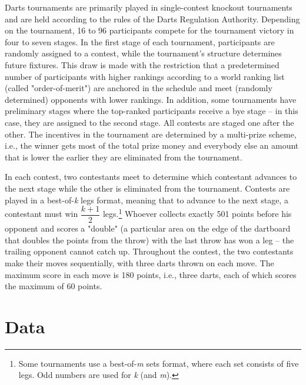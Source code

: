 \documentclass[11pt,a4paper]{article}
\let\Oldsection\section
\renewcommand{\section}{\FloatBarrier\Oldsection}
\begin{document}
Darts tournaments are primarily played in single-contest knockout tournaments and are held according to the rules of the Darts Regulation Authority. Depending on the tournament, 16 to 96 participants compete for the tournament victory in four to seven stages. In the first stage of each tournament, participants are randomly assigned to a contest, while the tournament's structure determines future fixtures. This draw is made with the restriction that a predetermined number of participants with higher rankings according to a world ranking list (called "order-of-merit") are anchored in the schedule and meet (randomly determined) opponents with lower rankings. In addition, some tournaments have preliminary stages where the top-ranked participants receive a bye stage -- in this case, they are assigned to the second stage. All contests are staged one after the other. The incentives in the tournament are determined by a multi-prize scheme, i.e., the winner gets most of the total prize money and everybody else an amount that is lower the earlier they are eliminated from the tournament. \par 

In each contest, two contestants meet to determine which contestant advances to the next stage while the other is eliminated from the tournament. Contests are played in a best-of-\textit{k} legs format, meaning that to advance to the next stage, a contestant must win $\dfrac{k+1}{2}$ legs.\footnote{Some tournaments use a best-of-\textit{m} sets format, where each set consists of five legs. Odd numbers are used for \textit{k} (and \textit{m}).}
Whoever collects exactly 501 points before his opponent and scores a "double" (a particular area on the edge of the dartboard that doubles the points from the throw) with the last throw has won a leg -- the trailing opponent cannot catch up. Throughout the contest, the two contestants make their moves sequentially, with three darts thrown on each move. The maximum score in each move is 180 points, i.e., three darts, each of which scores the maximum of 60 points. \par 

\section{Data}\label{sec:data}
\end{document}
